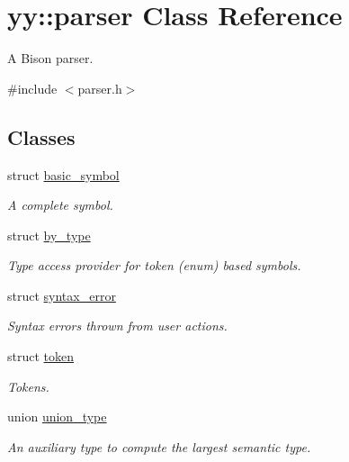 \hypertarget{classyy_1_1parser}{}\section{yy\+:\+:parser Class Reference}
\label{classyy_1_1parser}


A Bison parser.  




{\ttfamily \#include $<$parser.\+h$>$}

\subsection*{Classes}
\begin{DoxyCompactItemize}
\item 
struct \hyperlink{structyy_1_1parser_1_1basic__symbol}{basic\+\_\+symbol}
\begin{DoxyCompactList}\small\item\em A complete symbol. \end{DoxyCompactList}\item 
struct \hyperlink{structyy_1_1parser_1_1by__type}{by\+\_\+type}
\begin{DoxyCompactList}\small\item\em Type access provider for token (enum) based symbols. \end{DoxyCompactList}\item 
struct \hyperlink{structyy_1_1parser_1_1syntax__error}{syntax\+\_\+error}
\begin{DoxyCompactList}\small\item\em Syntax errors thrown from user actions. \end{DoxyCompactList}\item 
struct \hyperlink{structyy_1_1parser_1_1token}{token}
\begin{DoxyCompactList}\small\item\em Tokens. \end{DoxyCompactList}\item 
union \hyperlink{unionyy_1_1parser_1_1union__type}{union\+\_\+type}
\begin{DoxyCompactList}\small\item\em An auxiliary type to compute the largest semantic type. \end{DoxyCompactList}\end{DoxyCompactItemize}
